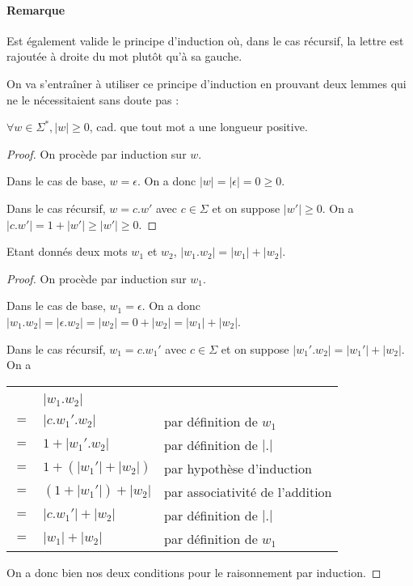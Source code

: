 \paragraph*{Remarque} Est également valide le principe d'induction où, dans le cas récursif, la lettre est rajoutée à droite du mot plutôt qu'à sa gauche.

On va s'entraîner à utiliser ce principe d'induction en prouvant deux lemmes qui ne le nécessitaient sans doute pas :

\begin{lemma}
$\forall w \in \Sigma^*, |w| \geq 0$, cad. que tout mot a une longueur positive.
\end{lemma}
\begin{proof}
On procède par induction sur $w$.

Dans le cas de base, $w = \epsilon$. On a donc $|w| = |\epsilon| = 0 \geq 0$.

Dans le cas récursif, $w = c.w'$ avec $c \in \Sigma$ et on suppose $|w'| \geq 0$. On a $|c.w'| = 1 + |w'| \geq |w'| \geq 0$.
\end{proof}

\begin{lemma}
Etant donnés deux mots $w_1$ et $w_2$, $|w_1.w_2| = |w_1| + |w_2|$. 
\end{lemma}

\begin{proof}
On procède par induction sur $w_1$.

Dans le cas de base, $w_1 = \epsilon$. On a donc $|w_1.w_2| = |\epsilon.w_2| = |w_2| = 0 + |w_2| = |w_1| + |w_2|$.

Dans le cas récursif, $w_1 = c.w_1'$ avec $c \in \Sigma$ et on suppose $|w_1'.w_2| = |w_1'| + |w_2|$. On a
\begin{tabular}{cll}
&&\\
& $|w_1.w_2|$ & \\
$=$ & $|c.w_1'.w_2|$ & par définition de $w_1$ \\
$=$&  $1 + |w_1'.w_2|$ & par définition de $|.|$ \\
$=$& $1 + (|w_1'| + |w_2|)$ & par hypothèse d'induction \\
$=$& $(1 + |w_1'|) + |w_2|$ & par associativité de l'addition \\
$=$& $|c.w_1'| + |w_2|$ & par définition de $|.|$ \\
$=$& $|w_1| + |w_2|$ & par définition de $w_1$
\end{tabular}

On a donc bien nos deux conditions pour le raisonnement par induction.
\end{proof}


